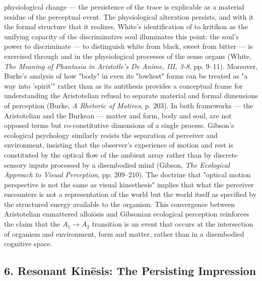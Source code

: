 physiological change --- the persistence of the trace is explicable as a material residue of the perceptual event. The physiological alteration persists, and with it the formal structure that it realizes. White's identification of to kritikon as the unifying capacity of the discriminative soul illuminates this point: the soul's power to discriminate --- to distinguish white from black, sweet from bitter --- is exercised through and in the physiological processes of the sense organs (White, \textit{The Meaning of Phantasia in Aristotle's De Anime, III, 3-8}, pp. 9--11). Moreover, Burke's analysis of how "body" in even its "lowliest" forms can be treated as "a way into 'spirit'" rather than as its antithesis provides a conceptual frame for understanding the Aristotelian refusal to separate material and formal dimensions of perception (Burke, \textit{A Rhetoric of Motives}, p. 203). In both frameworks --- the Aristotelian and the Burkean --- matter and form, body and soul, are not opposed terms but co-constitutive dimensions of a single process. Gibson's ecological psychology similarly resists the separation of perceiver and environment, insisting that the observer's experience of motion and rest is constituted by the optical flow of the ambient array rather than by discrete sensory inputs processed by a disembodied mind (Gibson, \textit{The Ecological Approach to Visual Perception}, pp. 209--210). The doctrine that "optical motion perspective is not the same as visual kinesthesis" implies that what the perceiver encounters is not a representation of the world but the world itself as specified by the structured energy available to the organism. This convergence between Aristotelian enmattered alloiōsis and Gibsonian ecological perception reinforces the claim that the $A_1$$\to$$A_2$ transition is an event that occurs at the intersection of organism and environment, form and matter, rather than in a disembodied cognitive space. 

\subsection*{6. Resonant Kinēsis: The Persisting Impression}

